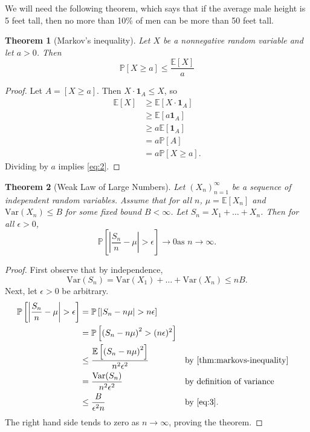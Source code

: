 \documentclass[10pt]{article}
\newtheorem{theorem}{Theorem}
\theoremstyle{definition}
\newcommand{\1}[1]{\textbf{1}_{\left[#1\right]}} %
\def\E{\mathbb{E}} %
\def\P{\mathbb{P}} %
\def\Var{\mathrm{Var}} %
\begin{document}
We will need the following theorem, which says that if the average male height
is 5 feet tall, then no more than 10\% of men can be more than 50 feet tall.

\begin{theorem}[Markov's inequality]
  \label{thm:markovs-inequality}
  Let $X$ be a nonnegative random variable and let $a>0$. Then
  \begin{equation}\label{eq:2}
    \P\left[X \geq a\right] \leq \frac{\E\left[X \right]}{a}
  \end{equation}
\end{theorem}
\begin{proof}
  Let $A= \left[ X \geq a\right]$. Then $X \cdot \mathbf{1}_{A}\leq X$, so
  \begin{align*}
    \E\left[X \right] 
    &\geq \E\left[X \cdot \mathbf{1}_{A} \right]\\
    &\geq \E\left[a \mathbf{1}_{A}\right]\\
    &\geq a \E\left[\mathbf{1}_{A} \right]\\
    &=a \P\left[A \right]\\
    &=a \P\left[X \geq a\right].
  \end{align*}
  Dividing by $a$ implies \cref{eq:2}.
\end{proof}


\begin{theorem}[Weak Law of Large Numbers]
  \label{thm:weak-law-large-numbers}
  Let $(X_{n})_{n=1}^{\infty}$ be a sequence of independent random variables.
  Assume that for all $n$, $\mu= \E\left[X_{n} \right]$ and
  $\Var(X_{n}) \leq B$ for some fixed bound $B<\infty$. Let
  $S_{n}=X_{1}+\ldots+X_{n}$. Then for all $\epsilon>0$,
  \begin{equation*}
    \P\left[ \left| \frac{S_{n}}{n}-\mu \right| >\epsilon\right] \to 0 \text{
      as } n \to \infty.
  \end{equation*}
\end{theorem}

\begin{proof}
  First observe that by independence,
  \begin{equation}\label{eq:3}
    \Var(S_{n}) = \Var(X_{1})+\ldots+\Var(X_{n}) \leq nB.
  \end{equation}
  Next, let $\epsilon>0$ be arbitrary.
  \begin{align*}
    \P\left[\left| \frac{S_{n}}{n}-\mu \right| >\epsilon\right]
    &= \P\left[\left| S_{n}-n\mu \right|> n\epsilon \right]\\
    &= \P\left[ \left( S_{n}-n\mu \right)^{2} > (n\epsilon)^{2}  \right]\\
    &\leq  \frac{\E\left[\left( S_{n}-n\mu \right)^{2}
      \right]}{n^{2}\epsilon^{2}} &&\text{by \cref{thm:markovs-inequality}}\\
    &= \frac{\Var(S_{n})}{n^{2}\epsilon^{2}} &&\text{by definition of variance }\\
    &\leq \frac{B}{\epsilon^{2}n} &&\text{by \cref{eq:3}}.
  \end{align*}
  The right hand side tends to zero as $n \to \infty$, proving the theorem.
\end{proof}
\end{document}

